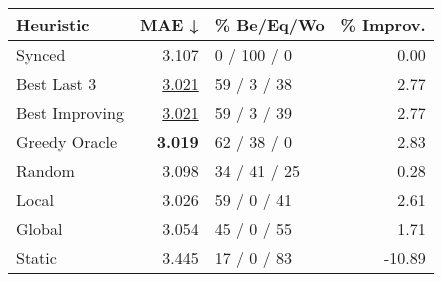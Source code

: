 \begin{tabular}{lrlr}
\toprule
\textbf{Heuristic} & \textbf{MAE ↓} & \textbf{\% Be/Eq/Wo} & \textbf{\% Improv.} \\
\midrule
            Synced &          3.107 &          0 / 100 / 0 &                0.00 \\
\midrule
       Best Last 3 &          \underline{3.021} &          59 / 3 / 38 &                2.77 \\
    Best Improving &          \underline{3.021} &          59 / 3 / 39 &                2.77 \\
\addlinespace
     Greedy Oracle &          \textbf{3.019} &          62 / 38 / 0 &                2.83 \\
            Random &          3.098 &         34 / 41 / 25 &                0.28 \\
\midrule
             Local &          3.026 &          59 / 0 / 41 &                2.61 \\
            Global &          3.054 &          45 / 0 / 55 &                1.71 \\
\midrule
            Static &          3.445 &          17 / 0 / 83 &              -10.89 \\
\bottomrule
\end{tabular}

\label{tab:ds_non_lr01_le2_bs4_Summary}
